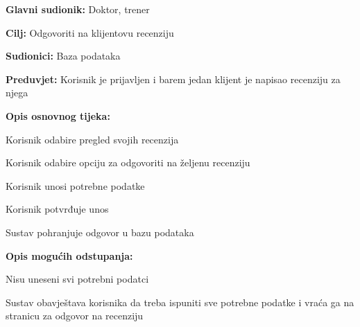 					\noindent {}
					\begin{packed_item}
						
						\item \textbf{Glavni sudionik:} Doktor, trener
						\item  \textbf{Cilj:} Odgovoriti na klijentovu recenziju
						\item  \textbf{Sudionici:} Baza podataka
						\item  \textbf{Preduvjet:} Korisnik je prijavljen i barem jedan klijent je napisao recenziju za njega
						\item  \textbf{Opis osnovnog tijeka:}
						
						\item[] \begin{packed_enum}
							
							\item Korisnik odabire pregled svojih recenzija
							\item Korisnik odabire opciju za odgovoriti na željenu recenziju
							\item Korisnik unosi potrebne podatke
							\item Korisnik potvrđuje unos
							\item Sustav pohranjuje odgovor u bazu podataka
							
						\end{packed_enum}
					
						\item  \textbf{Opis mogućih odstupanja:}
						
						\item[] \begin{packed_item}
							
							\item[4.a] Nisu uneseni svi potrebni podatci
							\item[] \begin{packed_enum}
								
								\item Sustav obavještava korisnika da treba ispuniti sve potrebne podatke i vraća ga na stranicu za odgovor na recenziju
								
							\end{packed_enum}
							
						\end{packed_item}
						
					\end{packed_item}
				
